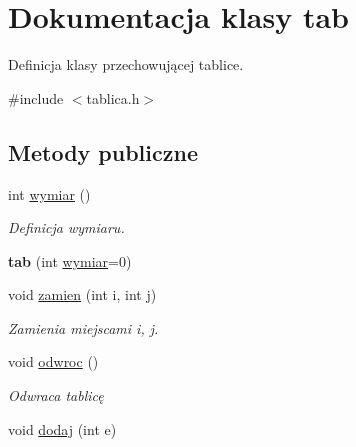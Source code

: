 \hypertarget{classtab}{\section{\-Dokumentacja klasy tab}
\label{classtab}
}


\-Definicja klasy przechowującej tablice.  




{\ttfamily \#include $<$tablica.\-h$>$}

\subsection*{\-Metody publiczne}
\begin{DoxyCompactItemize}
\item 
\hypertarget{classtab_ae9a39f118e9d520422a702f34a02a6d4}{int \hyperlink{classtab_ae9a39f118e9d520422a702f34a02a6d4}{wymiar} ()}\label{classtab_ae9a39f118e9d520422a702f34a02a6d4}

\begin{DoxyCompactList}\small\item\em \-Definicja wymiaru. \end{DoxyCompactList}\item 
\hypertarget{classtab_a62ce94ba44cb1cad08a795a6e694379f}{{\bfseries tab} (int \hyperlink{classtab_ae9a39f118e9d520422a702f34a02a6d4}{wymiar}=0)}\label{classtab_a62ce94ba44cb1cad08a795a6e694379f}

\item 
\hypertarget{classtab_aa6b0961d15e5ad55f4dc84d5ca0f693b}{void \hyperlink{classtab_aa6b0961d15e5ad55f4dc84d5ca0f693b}{zamien} (int i, int j)}\label{classtab_aa6b0961d15e5ad55f4dc84d5ca0f693b}

\begin{DoxyCompactList}\small\item\em \-Zamienia miejscami i, j. \end{DoxyCompactList}\item 
\hypertarget{classtab_ac618d6a3d5e17cd6afb0ba5c225f4416}{void \hyperlink{classtab_ac618d6a3d5e17cd6afb0ba5c225f4416}{odwroc} ()}\label{classtab_ac618d6a3d5e17cd6afb0ba5c225f4416}

\begin{DoxyCompactList}\small\item\em \-Odwraca tablicę \end{DoxyCompactList}\item 
\hypertarget{classtab_ae6e506c6264acf4367f6927624e3fed0}{void \hyperlink{classtab_ae6e506c6264acf4367f6927624e3fed0}{dodaj} (int e)}\label{classtab_ae6e506c6264acf4367f6927624e3fed0}


\end{DoxyCompactItemize}
